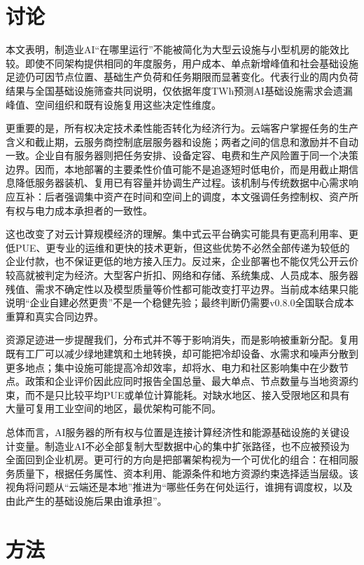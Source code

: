 \documentclass[preprint,12pt]{elsarticle}
\begin{document}
\section*{讨论}

本文表明，制造业AI“在哪里运行”不能被简化为大型云设施与小型机房的能效比较。即使不同架构提供相同的年度服务，用户成本、单点新增峰值和社会基础设施足迹仍可因节点位置、基础生产负荷和任务期限而显著变化。代表行业的周内负荷结果与全国基础设施筛查共同说明，仅依据年度TWh预测AI基础设施需求会遗漏峰值、空间组织和既有设施复用这些决定性维度。

更重要的是，所有权决定技术柔性能否转化为经济行为。云端客户掌握任务的生产含义和截止期，云服务商控制底层服务器和设施；两者之间的信息和激励并不自动一致。企业自有服务器则把任务安排、设备定容、电费和生产风险置于同一个决策边界。因而，本地部署的主要柔性价值可能不是追逐短时低电价，而是用截止期信息降低服务器装机、复用已有容量并协调生产过程。该机制与传统数据中心需求响应互补：后者强调集中资产在时间和空间上的调度，本文强调任务控制权、资产所有权与电力成本承担者的一致性。

这也改变了对云计算规模经济的理解。集中式云平台确实可能具有更高利用率、更低PUE、更专业的运维和更快的技术更新，但这些优势不必然全部传递为较低的企业付款，也不保证更低的地方接入压力。反过来，企业部署也不能仅凭公开云价较高就被判定为经济。大型客户折扣、网络和存储、系统集成、人员成本、服务器残值、需求不确定性以及模型质量等价性都可能改变打平边界。当前成本结果只能说明“企业自建必然更贵”不是一个稳健先验；最终判断仍需要v0.8.0全国联合成本重算和真实合同边界。

资源足迹进一步提醒我们，分布式并不等于影响消失，而是影响被重新分配。复用既有工厂可以减少绿地建筑和土地转换，却可能把冷却设备、水需求和噪声分散到更多地点；集中设施可能提高冷却效率，却将水、电力和社区影响集中在少数节点。政策和企业评价因此应同时报告全国总量、最大单点、节点数量与当地资源约束，而不是只比较平均PUE或单位计算能耗。对缺水地区、接入受限地区和具有大量可复用工业空间的地区，最优架构可能不同。

总体而言，AI服务器的所有权与位置是连接计算经济性和能源基础设施的关键设计变量。制造业AI不必全部复制大型数据中心的集中扩张路径，也不应被预设为全面回到企业机房。更可行的方向是把部署架构视为一个可优化的组合：在相同服务质量下，根据任务属性、资本利用、能源条件和地方资源约束选择适当层级。该视角将问题从“云端还是本地”推进为“哪些任务在何处运行，谁拥有调度权，以及由此产生的基础设施后果由谁承担”。

\section*{方法}
\end{document}
